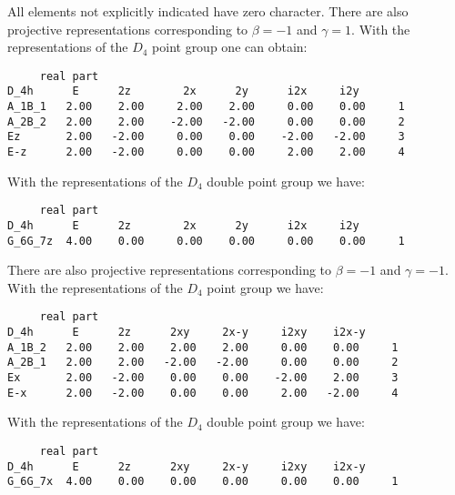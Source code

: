 \documentclass[12pt,a4paper]{article}
\begin{document}
All elements not explicitly indicated have zero character.
There are also projective representations corresponding to $\beta=-1$ 
and $\gamma=1$. With the representations of the $D_4$ point group one
can obtain:  
\begin{verbatim}
     real part
D_4h      E      2z        2x      2y      i2x     i2y
A_1B_1   2.00    2.00     2.00    2.00     0.00    0.00     1 
A_2B_2   2.00    2.00    -2.00   -2.00     0.00    0.00     2
Ez       2.00   -2.00     0.00    0.00    -2.00   -2.00     3
E-z      2.00   -2.00     0.00    0.00     2.00    2.00     4
\end{verbatim}
With the representations of the $D_4$ double point group we have:  
\begin{verbatim}
     real part
D_4h      E      2z        2x      2y      i2x     i2y
G_6G_7z  4.00    0.00     0.00    0.00     0.00    0.00     1
\end{verbatim}
There are also projective representations corresponding to $\beta=-1$ 
and $\gamma=-1$. With the representations of the $D_4$ point group we have:
\begin{verbatim}
     real part
D_4h      E      2z      2xy     2x-y     i2xy    i2x-y
A_1B_2   2.00    2.00    2.00    2.00     0.00    0.00     1
A_2B_1   2.00    2.00   -2.00   -2.00     0.00    0.00     2
Ex       2.00   -2.00    0.00    0.00    -2.00    2.00     3
E-x      2.00   -2.00    0.00    0.00     2.00   -2.00     4
\end{verbatim}
With the representations of the $D_4$ double point group we have:  
\begin{verbatim}
     real part
D_4h      E      2z      2xy     2x-y     i2xy    i2x-y
G_6G_7x  4.00    0.00    0.00    0.00     0.00    0.00     1
\end{verbatim}

\newpage
\end{document}
